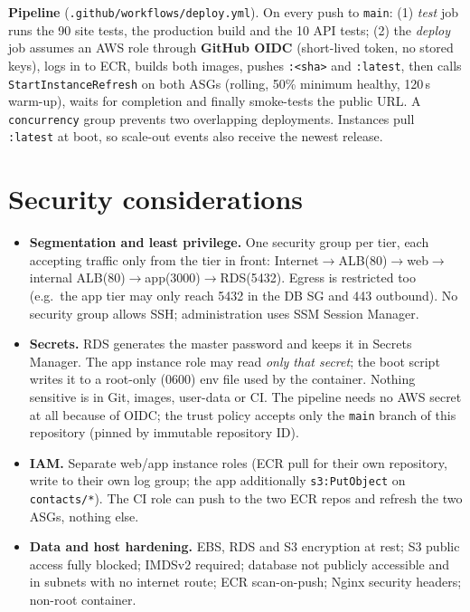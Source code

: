 \documentclass[10pt,a4paper]{article}
\begin{document}
\textbf{Pipeline} (\texttt{.github/workflows/deploy.yml}). On every push to \texttt{main}: (1) \emph{test} job runs the
90 site tests, the production build and the 10 API tests; (2) the \emph{deploy} job assumes an AWS role through
\textbf{GitHub OIDC} (short-lived token, no stored keys), logs in to ECR, builds both images, pushes
\texttt{:<sha>} and \texttt{:latest}, then calls \texttt{StartInstanceRefresh} on both ASGs (rolling, 50\% minimum healthy,
120\,s warm-up), waits for completion and finally smoke-tests the public URL. A \texttt{concurrency} group prevents two
overlapping deployments. Instances pull \texttt{:latest} at boot, so scale-out events also receive the newest release.

\section{Security considerations}
\begin{itemize}
\item \textbf{Segmentation and least privilege.} One security group per tier, each accepting traffic only from the tier in front:
Internet$\to$ALB(80)$\to$web$\to$internal ALB(80)$\to$app(3000)$\to$RDS(5432). Egress is restricted too (e.g.\ the app tier may only reach 5432 in the DB SG and 443 outbound). No security group allows SSH; administration uses SSM Session Manager.
\item \textbf{Secrets.} RDS generates the master password and keeps it in Secrets Manager. The app instance role may read \emph{only that secret}; the boot script writes it to a root-only (0600) env file used by the container. Nothing sensitive is in Git, images, user-data or CI. The pipeline needs no AWS secret at all because of OIDC; the trust policy accepts only the \texttt{main} branch of this repository (pinned by immutable repository ID).
\item \textbf{IAM.} Separate web/app instance roles (ECR pull for their own repository, write to their own log group; the app additionally \texttt{s3:PutObject} on \texttt{contacts/*}). The CI role can push to the two ECR repos and refresh the two ASGs, nothing else.
\item \textbf{Data and host hardening.} EBS, RDS and S3 encryption at rest; S3 public access fully blocked; IMDSv2 required; database not publicly accessible and in subnets with no internet route; ECR scan-on-push; Nginx security headers; non-root container.
\end{itemize}
\end{document}
